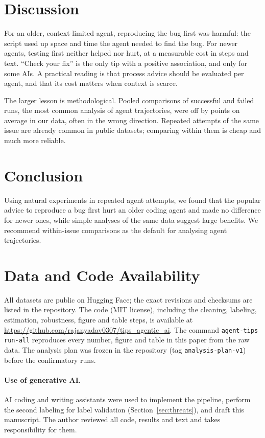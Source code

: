 \documentclass[sigconf,review=false,anonymous=false]{acmart}
\begin{document}
\section{Discussion}

For an older, context-limited agent, reproducing the bug first was harmful: the script used up space and time the agent needed to find the bug. For newer agents, testing first neither helped nor hurt, at a measurable cost in steps and text. ``Check your fix'' is the only tip with a positive association, and only for some AIs. A practical reading is that process advice should be evaluated per agent, and that its cost matters when context is scarce.

The larger lesson is methodological. Pooled comparisons of successful and failed runs, the most common analysis of agent trajectories, were off by \PThreeGap{} points on average in our data, often in the wrong direction. Repeated attempts of the same issue are already common in public datasets; comparing within them is cheap and much more reliable.

\section{Conclusion}

Using natural experiments in repeated agent attempts, we found that the popular advice to reproduce a bug first hurt an older coding agent and made no difference for \NumNewerModels{} newer ones, while simple analyses of the same data suggest large benefits. We recommend within-issue comparisons as the default for analysing agent trajectories.

\section{Data and Code Availability}

All datasets are public on Hugging Face; the exact revisions and checksums are listed in the repository. The code (MIT license), including the cleaning, labeling, estimation, robustness, figure and table steps, is available at \url{https://github.com/rajanyadav0307/tips_agentic_ai}. The command \texttt{agent-tips run-all} reproduces every number, figure and table in this paper from the raw data. The analysis plan was frozen in the repository (tag \texttt{analysis-plan-v1}) before the confirmatory runs.

\paragraph{Use of generative AI.} AI coding and writing assistants were used to implement the pipeline, perform the second labeling for label validation (Section~\ref{sec:threats}), and draft this manuscript. The author reviewed all code, results and text and takes responsibility for them.
\end{document}
